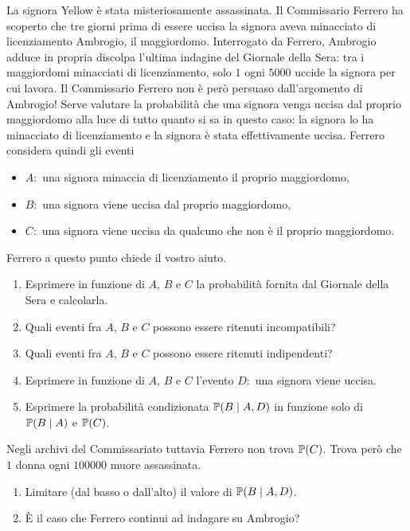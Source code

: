 La signora Yellow è stata misteriosamente assassinata. Il Commissario Ferrero ha scoperto che tre giorni prima di essere uccisa la signora aveva minacciato di licenziamento Ambrogio, il maggiordomo. Interrogato da Ferrero, Ambrogio adduce in propria discolpa l'ultima indagine del Giornale della Sera: tra i maggiordomi minacciati di licenziamento, solo $1$ ogni $5000$ uccide la signora per cui lavora. Il Commissario Ferrero non è però persuaso dall'argomento di Ambrogio! Serve valutare la probabilità che una signora venga uccisa dal proprio maggiordomo alla luce di tutto quanto si sa in questo caso: la signora lo ha minacciato di licenziamento e la signora è stata effettivamente uccisa. Ferrero considera quindi gli eventi
\begin{itemize}
	\item $A:$ una signora minaccia di licenziamento il proprio maggiordomo,
	\item $B:$ una signora viene uccisa dal proprio maggiordomo,
	\item $C:$ una signora viene uccisa da qualcuno che non è il proprio maggiordomo.
\end{itemize}
Ferrero a questo punto chiede il vostro aiuto.
\begin{enumerate}
	\item Esprimere in funzione di $A$, $B$ e $C$ la probabilità fornita dal Giornale della Sera e calcolarla.
	\item Quali eventi fra $A$, $B$ e $C$ possono essere ritenuti incompatibili?
	\item Quali eventi fra $A$, $B$ e $C$ possono essere ritenuti indipendenti?
	\item Esprimere in funzione di $A$, $B$ e $C$ l'evento $D:$ una signora viene uccisa.
	\item Esprimere la probabilità condizionata $\mathbb{P}( B\mid A,D)$ in funzione solo di $\mathbb{P}( B\mid A)$ e $\mathbb{P}( C)$.
\end{enumerate}
Negli archivi del Commissariato tuttavia Ferrero non trova $\mathbb{P}( C)$. Trova però che $1$ donna ogni $100000$ muore assassinata.
\begin{enumerate}
	\item Limitare (dal basso o dall'alto) il valore di $\mathbb{P}( B\mid A,D)$.
	\item È il caso che Ferrero continui ad indagare su Ambrogio?
\end{enumerate}


